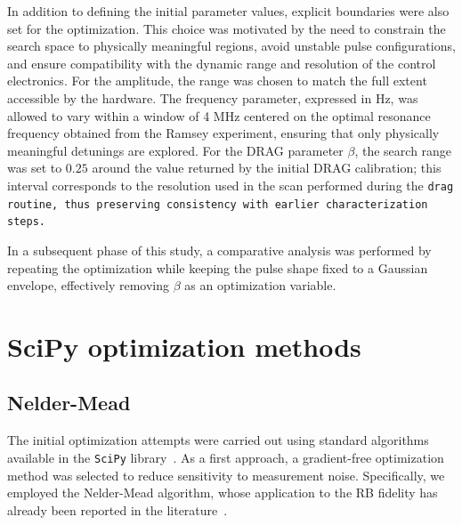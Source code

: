 In addition to defining the initial parameter values, explicit boundaries were also set for the optimization. 
This choice was motivated by the need to constrain the search space to physically meaningful regions, avoid unstable pulse configurations, and ensure compatibility with the dynamic range and resolution of the control electronics.
For the amplitude, the range was chosen to match the full extent accessible by the hardware. 
The frequency parameter, expressed in Hz, was allowed to vary within a window of 4 MHz centered on the optimal resonance frequency obtained from the Ramsey experiment, ensuring that only physically meaningful detunings are explored. 
For the DRAG parameter $\beta$, the search range was set to $0.25$ around the value returned by the initial DRAG calibration; this interval corresponds to the resolution used in the scan performed during the \tt{drag} routine, thus preserving consistency with earlier characterization steps.

In a subsequent phase of this study, a comparative analysis was performed by repeating the optimization while keeping the pulse shape fixed to a Gaussian envelope, effectively removing $\beta$ as an optimization variable. 

\section{SciPy optimization methods}\label{Sec:OptimizationMethods}

\subsection{Nelder-Mead}
The initial optimization attempts were carried out using standard algorithms available in the \texttt{SciPy} library~\cite{SciPy-NMeth}. 
As a first approach, a gradient-free optimization method was selected to reduce sensitivity to measurement noise. 
Specifically, we employed the Nelder-Mead algorithm, whose application to the RB fidelity has already been reported in the literature~\cite{kelly_optimal_2014}.

